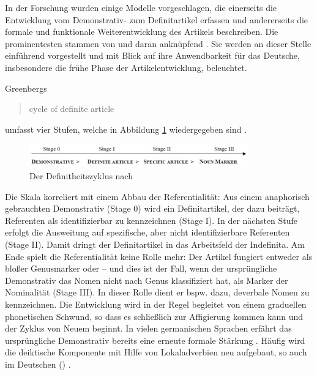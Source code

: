 In der Forschung wurden einige Modelle vorgeschlagen, die einerseits die Entwicklung vom Demonstrativ- zum Definitartikel erfassen und andererseits die formale und funktionale Weiterentwicklung des Artikels beschreiben. Die prominentesten stammen von \textcite{Greenberg1978} und daran anknüpfend \textcite{Lehmann2015}. Sie werden an dieser Stelle einführend vorgestellt und mit Blick auf ihre Anwendbarkeit für das Deutsche, insbesondere die frühe Phase der Artikelentwicklung, beleuchtet. 
%

Greenbergs \blockcquote[63]{Greenberg1978}{cycle of definite article} umfasst vier Stufen, welche in Abbildung \ref{abb:greenberg} \parencite[entnommen aus][525]{deMulder2011} wiedergegeben sind \parencite[vgl. auch][]{vanGelderen2007}. 

\begin{figure}
\begin{center}
  \includegraphics[width=9.5cm]{images/greenberg.jpg}
\caption {Der Definitheitszyklus nach \textcite{Greenberg1978}}
\label{abb:greenberg}
\end{center}
\end{figure}

Die Skala korreliert mit einem Abbau der Referentialität: Aus einem anaphorisch gebrauchten Demonstrativ (Stage 0) wird ein Definitartikel, der dazu beiträgt, Referenten als identifizierbar zu kennzeichnen (Stage I). In der nächsten Stufe erfolgt die Ausweitung auf spezifische, aber nicht identifizierbare Referenten (Stage II). Damit dringt der Definitartikel in das Arbeitsfeld der Indefinita. Am Ende spielt die Referentialität keine Rolle mehr: Der Artikel fungiert entweder als bloßer Genusmarker oder -- und dies ist der Fall, wenn der ursprüngliche Demonstrativ das Nomen nicht nach Genus klassifiziert hat, als Marker der Nominalität \parencite[69]{Greenberg1978} (Stage III). In dieser Rolle dient er bspw. dazu, deverbale Nomen zu kennzeichnen. Die Entwicklung wird in der Regel begleitet von einem graduellen phonetischen Schwund, so dass es schließlich zur Affigierung kommen kann und der Zyklus von Neuem beginnt. In vielen germanischen Sprachen erfährt das ursprüngliche Demonstrativ bereits eine erneute formale Stärkung \parencite[302ff.]{vanGelderen2007}. Häufig wird die deiktische Komponente mit Hilfe von Lokaladverbien neu aufgebaut, so auch im Deutschen () \parencite{Diessel1999}.

